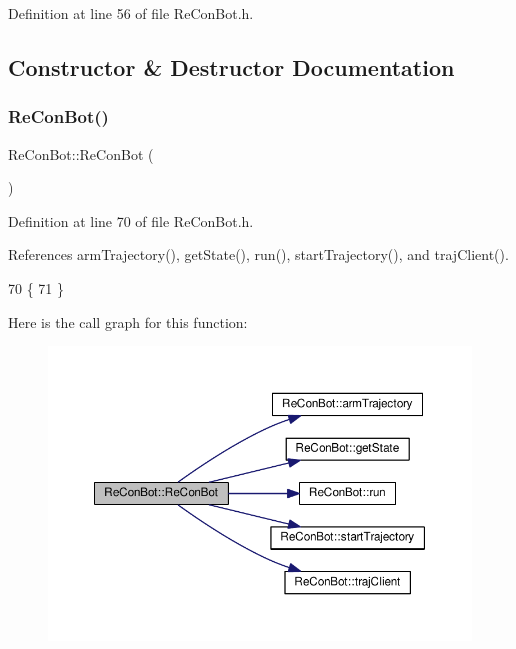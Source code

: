 Definition at line 56 of file Re\+Con\+Bot.\+h.



\subsection{Constructor \& Destructor Documentation}
\mbox{\label{class_re_con_bot_a3c0174965242ba69f252e09d18ce2e98}} 
\subsubsection{\texorpdfstring{Re\+Con\+Bot()}{ReConBot()}}
{\footnotesize\ttfamily Re\+Con\+Bot\+::\+Re\+Con\+Bot (\begin{DoxyParamCaption}{ }\end{DoxyParamCaption})\hspace{0.3cm}{\ttfamily [inline]}}



Definition at line 70 of file Re\+Con\+Bot.\+h.



References arm\+Trajectory(), get\+State(), run(), start\+Trajectory(), and traj\+Client().


\begin{DoxyCode}
70             \{
71   \}
\end{DoxyCode}
Here is the call graph for this function\+:\nopagebreak
\begin{figure}[H]
\begin{center}
\leavevmode
\includegraphics[width=350pt]{d9/d0b/class_re_con_bot_a3c0174965242ba69f252e09d18ce2e98_cgraph}
\end{center}
\end{figure}


